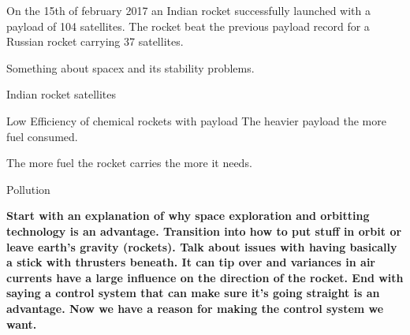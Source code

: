 On the 15th of february 2017 an Indian rocket successfully launched with a payload of 104 satellites. The rocket beat the previous payload record for a Russian rocket carrying 37 satellites.  






Something about spacex and its stability problems.

Indian rocket satellites 

Low Efficiency of chemical rockets with payload    
The heavier payload the more fuel consumed.

The more fuel the rocket carries the more it needs. 

Pollution 


\textbf{Start with an explanation of why space exploration and orbitting technology is an advantage. Transition into how to put stuff in orbit or leave earth's gravity (rockets). Talk about issues with having basically a stick with thrusters beneath. It can tip over and variances in air currents have a large influence on the direction of the rocket. End with saying a control system that can make sure it's going straight is an advantage. Now we have a reason for making the control system we want.}


